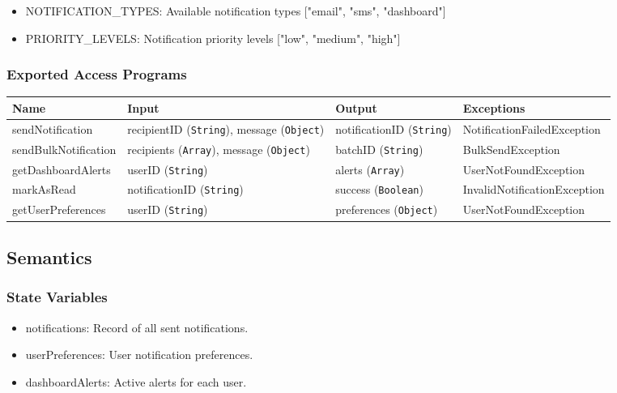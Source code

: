 \documentclass[12pt, titlepage]{article}
\begin{document}
\begin{itemize}
    \item NOTIFICATION\_TYPES: Available notification types ["email", "sms", "dashboard"]
    \item PRIORITY\_LEVELS: Notification priority levels ["low", "medium", "high"]
\end{itemize}


\subsubsection{Exported Access Programs}
\begin{center}
    \scriptsize
    \begin{tabular}{|p{3cm}|p{4cm}|p{4cm}|p{4cm}|} %
        \hline
        \textbf{Name} & \textbf{Input} & \textbf{Output} & \textbf{Exceptions} \\
        \hline
        sendNotification & recipientID (\texttt{String}), message (\texttt{Object}) & notificationID (\texttt{String}) & NotificationFailedException \\
        \hline
        sendBulkNotification & recipients (\texttt{Array}), message (\texttt{Object}) & batchID (\texttt{String}) & BulkSendException \\
        \hline
        getDashboardAlerts & userID (\texttt{String}) & alerts (\texttt{Array}) & UserNotFoundException \\
        \hline
        markAsRead & notificationID (\texttt{String}) & success (\texttt{Boolean}) & InvalidNotificationException \\
        \hline
        getUserPreferences & userID (\texttt{String}) & preferences (\texttt{Object}) & UserNotFoundException \\
        \hline
    \end{tabular}
\end{center}

\subsection{Semantics}
\subsubsection{State Variables}
\begin{itemize}
    \item notifications: Record of all sent notifications.
    \item userPreferences: User notification preferences.
    \item dashboardAlerts: Active alerts for each user.
\end{itemize}
\end{document}
